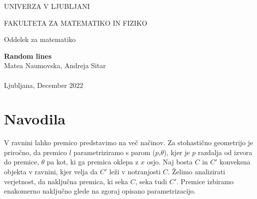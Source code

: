 \documentclass[a4paper,12pt]{article}
\begin{document}
\thispagestyle{empty}
\begin{center}
	
\begin{center}
	\normalsize
	UNIVERZA V LJUBLJANI
	
	FAKULTETA ZA MATEMATIKO IN FIZIKO
	
	Oddelek za matematiko
\end{center}
\vspace{6cm}	
	\vspace{1.5cm}
	{\Large \bfseries Random lines
		\vspace{0.1cm}} \\  
	\vspace{0.5cm} {\normalsize Matea Naumovska, Andreja Sitar}
	\vspace{0.2cm} \\
	\vspace{0.1cm}{\normalsize Finančni praktikum}
	\vspace{2cm} \\
	\vspace{7cm}
	{\normalsize Ljubljana, December 2022}
\end{center}

\newpage
\section{Navodila}	
V ravnini lahko premico predstavimo na več načinov. Za stohastično geometrijo je priročno, da premico $l$ parametriziramo s parom ($p$,$\theta$), kjer je $p$ razdalja od izvora do premice, $\theta$ pa kot, ki ga premica oklepa z $x$ osjo. 
Naj bosta $C$ in $C'$ konveksna objekta v ravnini, kjer velja da $C'$ leži v notranjosti $C$. Želimo analizirati verjetnost, da naključna premica, ki seka $C$, seka tudi $C'$.
Premice izbiramo enakomerno naključno glede na zgoraj opisano parametrizacijo. 
\end{document}
